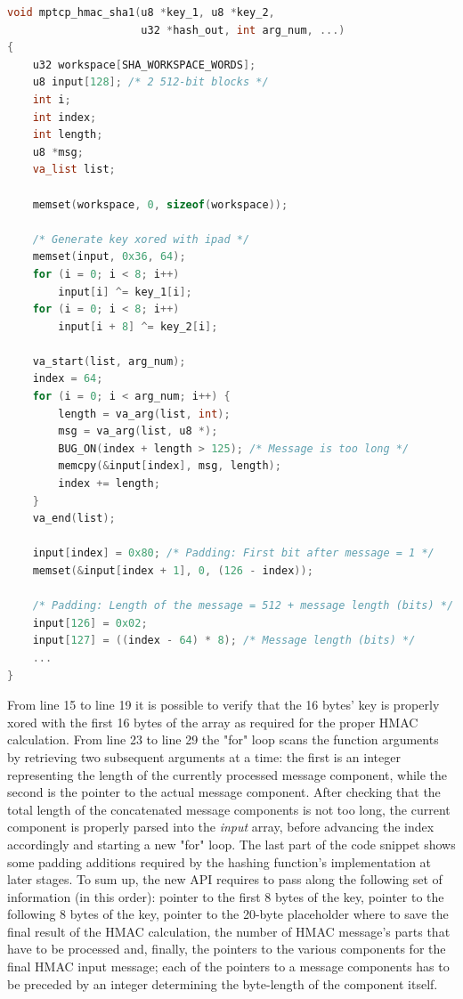 \begin{lstlisting}[language=c, caption=\textit{Implementation for the new \textit{mptcp\_hmac\_sha1() function (first part)}}, label=newhmac]
void mptcp_hmac_sha1(u8 *key_1, u8 *key_2, 
                     u32 *hash_out, int arg_num, ...)
{
    u32 workspace[SHA_WORKSPACE_WORDS];
	u8 input[128]; /* 2 512-bit blocks */
	int i;
	int index;
	int length;
	u8 *msg;
	va_list list;

	memset(workspace, 0, sizeof(workspace));

	/* Generate key xored with ipad */
	memset(input, 0x36, 64);
	for (i = 0; i < 8; i++)
		input[i] ^= key_1[i];
	for (i = 0; i < 8; i++)
		input[i + 8] ^= key_2[i];

	va_start(list, arg_num);
	index = 64;
	for (i = 0; i < arg_num; i++) {
		length = va_arg(list, int);
		msg = va_arg(list, u8 *);
		BUG_ON(index + length > 125); /* Message is too long */
		memcpy(&input[index], msg, length);
		index += length;
	}
	va_end(list);

	input[index] = 0x80; /* Padding: First bit after message = 1 */
	memset(&input[index + 1], 0, (126 - index));

	/* Padding: Length of the message = 512 + message length (bits) */
	input[126] = 0x02;
	input[127] = ((index - 64) * 8); /* Message length (bits) */
	...
}
\end{lstlisting}

From line 15 to line 19 it is possible to verify that the 16 bytes' key is properly xored with the first 16 bytes of the array as required for the proper HMAC calculation. From line 23 to line 29 the "for" loop scans the function arguments by retrieving two subsequent arguments at a time: the first is an integer representing the length of the currently processed message component, while the second is the pointer to the actual message component. After checking that the total length of the concatenated message components is not too long, the current component is properly parsed into the \textit{input} array, before advancing the index accordingly and starting a new "for" loop. The last part of the code snippet shows some padding additions required by the hashing function's implementation at later stages. 
To sum up, the new API requires to pass along the following set of information (in this order): pointer to the first 8 bytes of the key, pointer to the following 8 bytes of the key, pointer to the 20-byte placeholder where to save the final result of the HMAC calculation, the number of HMAC message's parts that have to be processed and, finally, the pointers to the various components for the final HMAC input message; each of the pointers to a message components has to be preceded by an integer determining the byte-length of the component itself.

